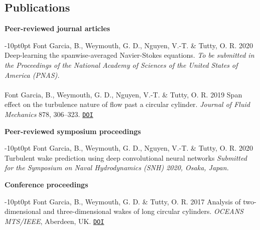 \documentclass[line]{res}
\newenvironment{p}
  {\begin{adjustwidth}{-10pt}{0pt}}
  {\end{adjustwidth}}
\begin{document}
\begin{resume}
\section{Publications}
\vspace{0.25cm}
\hspace{-1cm}\textbf{Peer-reviewed journal articles}\vspace{0.25cm}
\begin{p}
Font Garcia, B., Weymouth, G. D., Nguyen, V.-T. \& Tutty, O. R. 2020 Deep-learning the spanwise-averaged Navier-Stokes equations. \textit{To be submitted in the Proceedings of the National Academy of Sciences of the United States of America (PNAS).}\\
\\
Font Garcia, B., Weymouth, G. D., Nguyen, V.-T. \& Tutty, O. R. 2019 Span effect on the turbulence nature of flow past a circular cylinder. \textit{Journal of Fluid Mechanics} 878, 306--323. \href{https://doi.org/10.1017/jfm.2019.637}{\texttt{DOI}}
\end{p}

\hspace{-1cm}\textbf{Peer-reviewed symposium proceedings}\vspace{0.25cm}
\begin{p}
Font Garcia, B., Weymouth, G. D., Nguyen, V.-T. \& Tutty, O. R. 2020 Turbulent wake prediction using deep convolutional neural networks \textit{Submitted for the Symposium on Naval Hydrodynamics (SNH) 2020, Osaka, Japan.}
\end{p}

\hspace{-1cm}\textbf{Conference proceedings}\vspace{0.25cm}
\begin{p}
Font Garcia, B., Weymouth, G. D.  \&  Tutty, O. R. 2017 Analysis of two-dimensional and three-dimensional wakes of long circular cylinders. {\em OCEANS MTS/IEEE}, Aberdeen, 	UK. \href{https://doi.org/10.1109/OCEANSE.2017.8084904}{\texttt{DOI}}
\end{p}


\end{resume}
\end{document}
